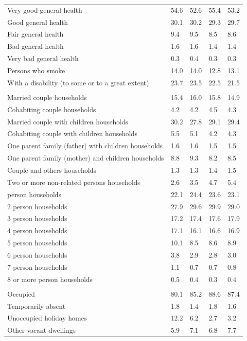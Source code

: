 \documentclass{article}
\begin{document}
\begin{table}[h]
\begin{tabular}{KTTTT}
    \hline
Very good general health & 54.6& 52.6&55.4& 53.2\\
Good general health & 30.1& 30.2& 29.3& 29.7\\
Fair general health & 9.4& 9.5&8.5& 8.6\\
Bad general health & 1.6& 1.6&1.4& 1.4\\
Very bad general health & 0.3& 0.4&0.3& 0.3\\
    \hline
Persons who smoke & 14.0& 14.0&12.8& 13.1\\
    \hline
With a disability (to some or to a great extent) & 23.7& 23.5&22.5& 21.5\\
\hline
    \\ 
    \hline
Married couple households & 15.4& 16.0& 15.8& 14.9\\
Cohabiting couple households & 4.2& 4.2& 4.5& 4.3\\
Married couple with children households & 30.2& 27.8& 29.1& 29.4\\
Cohabiting couple with children households & 5.5& 5.1& 4.2& 4.3\\
One parent family (father) with  children households & 1.6& 1.6& 1.5& 1.5\\
One parent family (mother) and children households & 8.8& 9.3& 8.2& 8.5\\
Couple and others households  & 1.3& 1.3& 1.4& 1.5\\
Two or more non-related persons households & 2.6& 3.5& 4.7& 5.4\\
     person households & 22.1& 24.4& 23.6& 23.1\\
2 person households & 27.9& 29.6& 29.9& 29.0\\
3 person households & 17.2& 17.4& 17.6& 17.9\\
4 person households & 17.1& 16.1& 16.6& 16.9\\
5 person households & 10.1&  8.5&  8.6&  8.9\\
6 person households & 3.8& 2.9& 2.8& 3.0\\
7 person households & 1.1& 0.7& 0.7& 0.8\\
8 or more person households & 0.5& 0.4& 0.3& 0.4\\
\hline
    \\ 
    \hline
Occupied & 80.1& 85.2& 88.6& 87.4\\
Temporarily absent & 1.8& 1.4& 1.8& 1.6\\
Unoccupied holiday homes & 12.2&  6.2&  2.7&  3.2\\
Other vacant dwellings & 5.9& 7.1& 6.8& 7.7\\
\hline
\end{tabular}
\end{table}
\end{document}
